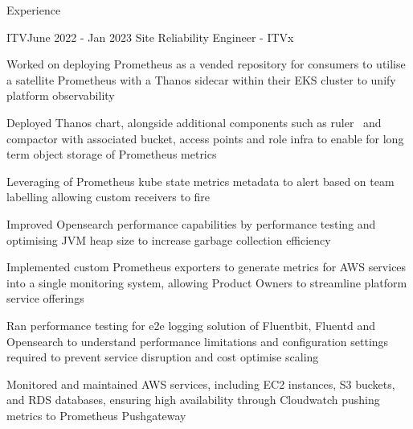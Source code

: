\documentclass{resume} %
\begin{document}
\begin{rSection}{Experience}
\begin{rSubsection}{ITV}{June 2022 - Jan 2023}
{Site Reliability Engineer - ITVx}{}
\normalfont
\item Worked on deploying Prometheus as a vended repository for consumers to utilise a satellite Prometheus with a Thanos sidecar within their EKS cluster to unify platform observability
\item Deployed Thanos chart, alongside additional components such as ruler \ and  compactor with associated bucket, access points and role infra to enable for long term object storage of Prometheus metrics
\item Leveraging of Prometheus kube state metrics metadata to alert based on team labelling allowing custom receivers to fire
\item Improved Opensearch performance capabilities by performance testing and optimising JVM heap size to increase garbage collection efficiency
\item Implemented custom Prometheus exporters to generate metrics for AWS services into a single monitoring system, allowing Product Owners to streamline platform service offerings
\item Ran performance testing for e2e logging solution of Fluentbit, Fluentd and Opensearch to understand performance limitations and configuration settings required to prevent service disruption and cost optimise scaling
\item Monitored and maintained AWS services, including EC2 instances, S3 buckets, and RDS databases, ensuring high availability through Cloudwatch pushing metrics to Prometheus Pushgateway
\end{rSubsection}


\end{rSection}
\end{document}

